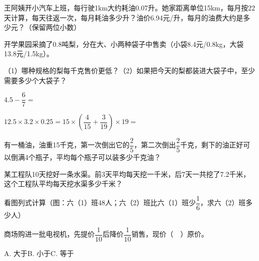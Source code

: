 \vspace{5cm}
\begin{mistake}
王阿姨开小汽车上班，每行驶1km大约耗油0.07升。她家距离单位15km，每月按22天计算，每天往返一次，每月耗油多少升？油价6.94元/升，每月的油费大约是多少元？（保留两位小数）
\end{mistake}

\vspace{5cm}
\begin{mistake}
开学果园采摘了0.8吨梨，分在大、小两种袋子中售卖（小袋8.4元/0.8kg，大袋13.8元/1.5kg）。

（1）哪种规格的梨每千克售价更低？（2）如果把今天的梨都装进大袋子中，至少需要多少个大袋子？
\end{mistake}

\vspace{5cm}
\begin{mistake}
$4.5-\dfrac{6}{7}=$
\end{mistake}

\vspace{5cm}
\begin{mistake}
$12.5\times3.2\times0.25=$\quad $15\times\left(\dfrac{4}{15}+\dfrac{3}{19}\right)\times19=$
\end{mistake}

\vspace{5cm}
\begin{mistake}
有一桶油，油重15千克，第一次倒出它的$\dfrac{2}{5}$，第二次倒出$\dfrac{2}{5}$千克，剩下的油正好可以倒满4个瓶子，平均每个瓶子可以装多少千克油？
\end{mistake}

\vspace{5cm}
\begin{mistake}
某工程队10天挖好一条水渠。前3天平均每天挖一千米，后7天一共挖了7.2千米，这个工程队平均每天挖水渠多少千米？
\end{mistake}

\vspace{5cm}
\begin{mistake}
看图列式计算（图：六（1）班48人；六（2）班比六（1）班少$\dfrac{1}{6}$，求六（2）班多少人）
\end{mistake}

\vspace{5cm}
\begin{mistake}
商场购进一批电视机，先提价$\dfrac{1}{10}$后降价$\dfrac{1}{10}$销售，现价（$\quad$）原价。

A. 大于\quad B. 小于\quad C. 等于
\end{mistake}


